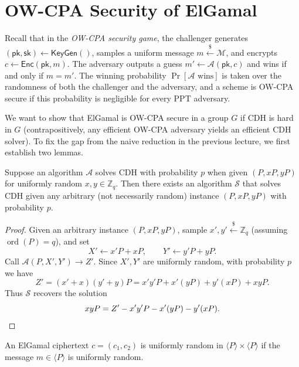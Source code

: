 
\section*{OW-CPA Security of ElGamal}

Recall that in the \emph{OW-CPA security game}, the challenger generates \((\mathsf{pk}, \mathsf{sk}) \gets \mathsf{KeyGen}()\), samples a uniform message \(m \xleftarrow{\$} \mathcal{M}\), and encrypts \(c \gets \mathsf{Enc}(\mathsf{pk}, m)\).
The adversary outputs a guess \(m' \gets \mathcal{A}(\mathsf{pk}, c)\) and wins if and only if \(m = m'\).
The winning probability \(\Pr[\mathcal{A} \text{ wins}]\) is taken over the randomness of both the challenger and the adversary, and a scheme is OW-CPA secure if this probability is negligible for every PPT adversary.

We want to show that ElGamal is OW-CPA secure in a group \(G\) if CDH is hard in \(G\) (contrapositively, any efficient OW-CPA adversary yields an efficient CDH solver).
To fix the gap from the naive reduction in the previous lecture, we first establish two lemmas.

\begin{lemma}\label{lem:cdh-random-self-reduction}
    Suppose an algorithm \(\mathcal{A}\) solves CDH with probability \(p\) when given \((P, xP, yP)\) for uniformly random \(x, y \in \mathbb{Z}_q\).
    Then there exists an algorithm \(\mathcal{S}\) that solves CDH given any arbitrary (not necessarily random) instance \((P, xP, yP)\) with probability \(p\).
\end{lemma}

\begin{proof}
    Given an arbitrary instance \((P, xP, yP)\), sample \(x', y' \xleftarrow{\$} \mathbb{Z}_q\) (assuming \(\operatorname{ord}(P) = q\)), and set
    \[
        X' \gets x'P + xP, \qquad Y' \gets y'P + yP.
    \]
    Call \(\mathcal{A}(P, X', Y') \to Z'\).
    Since \(X', Y'\) are uniformly random, with probability \(p\) we have
    \[
        Z' = (x' + x)(y' + y)P = x'y'P + x'(yP) + y'(xP) + xyP.
    \]
    Thus \(\mathcal{S}\) recovers the solution
    \[
        xyP = Z' - x'y'P - x'(yP) - y'(xP). \qedhere
    \]
\end{proof}

\begin{lemma}\label{lem:elgamal-uniform-ct}
    An ElGamal ciphertext \(c = (c_1, c_2)\) is uniformly random in \(\langle P \rangle \times \langle P \rangle\) if the message \(m \in \langle P \rangle\) is uniformly random.
\end{lemma}

